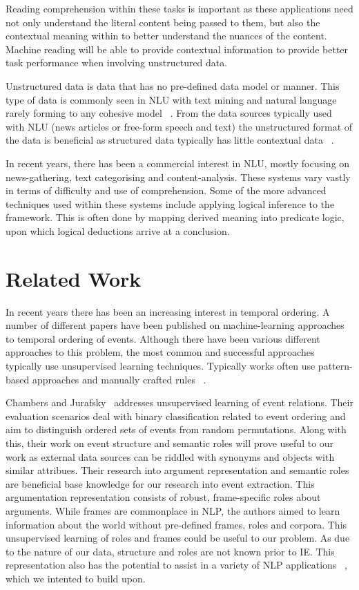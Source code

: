 \documentclass[bsc,frontabs,twoside,singlespacing,parskip,deptreport]{infthesis}     %
\begin{document}
Reading comprehension within these tasks is important as these applications need not only understand the literal content
being passed to them, but also the contextual meaning within to better understand the nuances of the content.
Machine reading will be able to provide contextual information to provide better task performance when
involving unstructured data.

Unstructured data is data that has no pre-defined data model or manner. This type of data is
commonly seen in NLU with text mining and natural language rarely forming to any cohesive model ~\cite{feldman2007text}.
From the data sources typically used with NLU (news articles or free-form speech and text) the unstructured format of
the data is beneficial as structured data typically has little contextual data ~\cite{feldman2007text}.

In recent years, there has been a commercial interest in NLU, mostly focusing on news-gathering, text categorising and
content-analysis. These systems vary vastly in terms of difficulty and use of comprehension. Some of the more
advanced techniques used within these systems include applying logical inference to the framework. This is often done
by mapping derived meaning into predicate logic, upon which logical deductions arrive at a conclusion.


\section{Related Work}
In recent years there has been an increasing interest in temporal ordering.
A number of different papers have been published on machine-learning approaches to temporal ordering of events.
Although there have been various different approaches to this problem, the most common and successful approaches typically
use unsupervised learning techniques. Typically works often use pattern-based approaches and manually crafted rules ~\cite{chklovski2004mining}.  

Chambers and Jurafsky~\cite{chambers2009unsupervised} addresses unsupervised learning of event relations. Their evaluation
scenarios deal with binary classification related to event ordering and aim to distinguish ordered sets
of events from random permutations. Along with this, their work on event structure and semantic roles will prove useful
to our work as external data sources can be riddled with synonyms and objects with similar attribues.
Their research into argument representation and semantic roles are beneficial base
knowledge for our research into event extraction.
This argumentation representation consists of robust,
frame-specific roles about arguments. While frames are commonplace in NLP, the authors aimed to learn information
about the world without pre-defined frames, roles and corpora. This unsupervised learning of roles and frames could
be useful to our problem. As due to the nature of our data, structure and roles are not known prior to
IE. This representation also has the potential to assist in a variety of NLP applications ~\cite{chambers2009unsupervised}, which
we intented to build upon.
\end{document}
